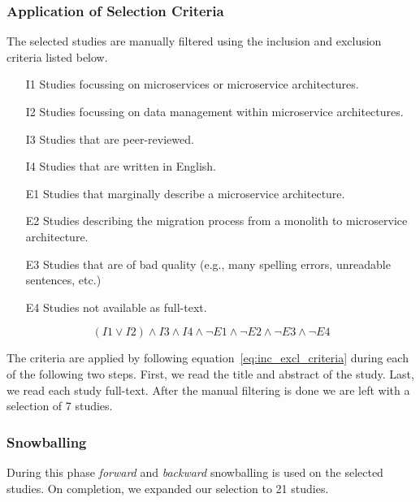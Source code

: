 \subsubsection{Application of Selection Criteria}

The selected studies are manually filtered using the inclusion and exclusion criteria \cite{syslit1,syslit2,syslit3} listed below.
\begin{enumerate}
    \item[{I}1] Studies focussing on microservices or microservice architectures.
    \item[{I}2] Studies focussing on data management within microservice architectures.
    \item[{I}3] Studies that are peer-reviewed.
    \item[{I}4] Studies that are written in English.
    \item[{E}1] Studies that marginally describe a microservice architecture.
    \item[{E}2] Studies describing the migration process from a monolith to microservice architecture.
    \item[{E}3] Studies that are of bad quality (e.g., many spelling errors, unreadable sentences, etc.)
    \item[{E}4] Studies not available as full-text.
\end{enumerate}
\begin{equation}
    (I1 \vee I2) \wedge I3 \wedge I4 \wedge \neg E1  \wedge \neg E2  \wedge \neg E3  \wedge \neg E4
    \label{eq:inc_excl_criteria}
\end{equation}

The criteria are applied by following equation~\ref{eq:inc_excl_criteria} during each of the following two steps. First, we read the title and abstract of the study. Last, we read each study full-text. After the manual filtering is done we are left with a selection of 7 studies.

\subsubsection{Snowballing}
During this phase \textit{forward} and \textit{backward} snowballing \cite{syslit4} is used on the selected studies. On completion, we expanded our selection to 21 studies.

